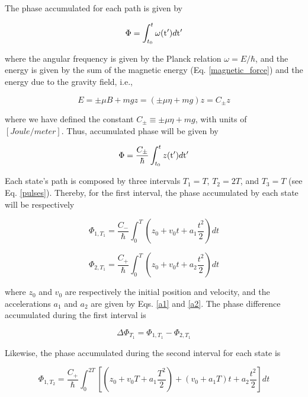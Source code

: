 \documentclass{article}
\begin{document}
The phase accumulated for each path is given by

\begin{equation}
\Phi = \int_{t_{0}}^{t} \omega(\ce{^{}_{}t{'}_{}})d\ce{^{}_{}t{'}_{}}
\end{equation}

where the angular frequency is given by the Planck relation $\omega = E / \hbar$, and the energy is given by the sum of the magnetic energy (Eq. \ref{magnetic_force}) and the energy due to the gravity field, i.e.,

\begin{equation}
E = \pm \mu B + mgz = (\pm \mu \eta + mg)z = C_{\pm} z
\end{equation}

where we have defined the constant $C_{\pm} \equiv \pm \mu \eta + mg$, with units of $[Joule/meter]$. Thus, accumulated phase will be given by

\begin{equation}\label{semi_classical_phase}
\Phi = \frac{C_{\pm}}{\hbar} \int_{t_{0}}^{t} z(\ce{^{}_{}t{'}_{}})d\ce{^{}_{}t{'}_{}}
\end{equation}

Each state's path is composed by three intervals $T_{1}=T$, $T_{2}=2T$, and $T_{3}=T$ (see Eq. \ref{pulses}). Thereby, for the first interval, the phase accumulated by each state will be respectively

\begin{equation}\label{phi1t1}
\Phi_{1, T_{1}} = \frac{C_{-}}{\hbar} \int_{0}^{T} (z_{0}+v_{0}t+a_{1} \frac{t^{2}}{2})dt
\end{equation}

\begin{equation}
\Phi_{2, T_{1}} = \frac{C_{+}}{\hbar} \int_{0}^{T} (z_{0}+v_{0}t+a_{2} \frac{t^{2}}{2})dt
\end{equation}

where $z_{0}$ and $v_{0}$ are respectively the initial position and velocity,
and the accelerations $a_{1}$ and $a_{2}$ are given by Eqs. \ref{a1} and \ref{a2}. The phase difference accumulated during the first interval is

\begin{equation}
\Delta \Phi_{T_{1}} = \Phi_{1, T_{1}} - \Phi_{2, T_{1}}
\end{equation}

Likewise, the phase accumulated during the second interval for each state is

\begin{equation}
\Phi_{1, T_{2}} = \frac{C_{+}}{\hbar} \int_{0}^{2T} [(z_{0}+v_{0}T+a_{1} \frac{T^{2}}{2}) + (v_{0}+a_{1}T)t + a_{2} \frac{t^{2}}{2}]dt
\end{equation}
\end{document}
